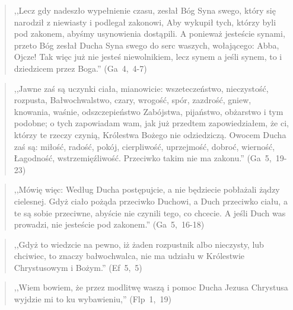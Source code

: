 \documentclass[10pt,a4paper,oneside]{article}
\begin{document}
\begin{quote}
,,Lecz gdy nadeszło wypełnienie czasu, zesłał Bóg Syna swego, który się narodził z niewiasty i podlegał zakonowi, Aby wykupił tych, którzy byli pod zakonem, abyśmy usynowienia dostąpili. A ponieważ jesteście synami, przeto Bóg zesłał Ducha Syna swego do serc waszych, wołającego: Abba, Ojcze! Tak więc już nie jesteś niewolnikiem, lecz synem a jeśli synem, to i dziedzicem przez Boga.'' \mbox{(Ga 4, 4-7)}
\end{quote}
\begin{quote}
,,Jawne zaś są uczynki ciała, mianowicie: wszeteczeństwo, nieczystość, rozpusta, Bałwochwalstwo, czary, wrogość, spór, zazdrość, gniew, knowania, waśnie, odszczepieństwo Zabójstwa, pijaństwo, obżarstwo i tym podobne; o tych zapowiadam wam, jak już przedtem zapowiedziałem, że ci, którzy te rzeczy czynią, Królestwa Bożego nie odziedziczą. Owocem Ducha zaś są: miłość, radość, pokój, cierpliwość, uprzejmość, dobroć, wierność, Łagodność, wstrzemięźliwość. Przeciwko takim nie ma zakonu.'' \mbox{(Ga 5, 19-23)}
\end{quote}
\begin{quote}
,,Mówię więc: Według Ducha postępujcie, a nie będziecie pobłażali żądzy cielesnej. Gdyż ciało pożąda przeciwko Duchowi, a Duch przeciwko ciału, a te są sobie przeciwne, abyście nie czynili tego, co chcecie. A jeśli Duch was prowadzi, nie jesteście pod zakonem.'' \mbox{(Ga 5, 16-18)}
\end{quote}
\begin{quote}
,,Gdyż to wiedzcie na pewno, iż żaden rozpustnik albo nieczysty, lub chciwiec, to znaczy bałwochwalca, nie ma udziału w Królestwie Chrystusowym i Bożym.'' \mbox{(Ef 5, 5)}
\end{quote}
\begin{quote}
,,Wiem bowiem, że przez modlitwę waszą i pomoc Ducha Jezusa Chrystusa wyjdzie mi to ku wybawieniu,'' \mbox{(Flp 1, 19)}
\end{quote}
\end{document}
